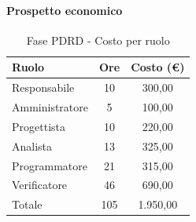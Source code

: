\documentclass[../PianoProgetto.tex]{subfiles}
\begin{document}
	\paragraph{Prospetto economico}
					
	\begin{table}[h]
		\centering
	
		\begin{tabular}{l * {2}{c}}
			\toprule
			\textbf{Ruolo} & \textbf{Ore} & \textbf{Costo (\euro{})} \\
			\midrule
			Responsabile &	10 & 300,00 \\
			Amministratore & 5 & 100,00 \\
			Progettista & 10 & 220,00 \\
			Analista & 13 & 325,00 \\
			Programmatore & 21 & 315,00 \\
			Verificatore & 46 & 690,00 \\
			\midrule		
			Totale & 105 & 1.950,00 \\
			\bottomrule
		\end{tabular}
		\caption{Fase PDRD - Costo per ruolo}
		\label{tab:fasePDRD_costo}
	\end{table}
\vfill	
	
\end{document}
